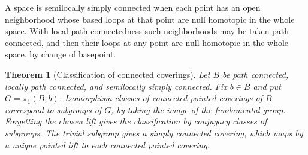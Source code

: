 \documentclass[11pt,oneside,openany]{book}
\theoremstyle{plain}
\newtheorem{theorem}{Theorem}[chapter]
\theoremstyle{definition}
\theoremstyle{remark}
\begin{document}
A space is semilocally simply connected when each point has
an open neighborhood whose based loops at that point are
null homotopic in the whole space. With local path
connectedness such neighborhoods may be taken path
connected, and then their loops at any point are null
homotopic in the whole space, by change of basepoint.

\begin{theorem}[Classification of connected coverings]
\label{thm:p202-cover-classification}
Let \(B\) be path connected, locally path connected, and
semilocally simply connected. Fix \(b\in B\) and put
\(G=\pi_1(B,b)\). Isomorphism classes of connected pointed
coverings of \(B\) correspond to subgroups of \(G\), by
taking the image of the fundamental group. Forgetting the
chosen lift gives the classification by conjugacy classes
of subgroups. The trivial subgroup gives a simply connected
covering, which maps by a unique pointed lift to each
connected pointed covering.
\end{theorem}
\end{document}

